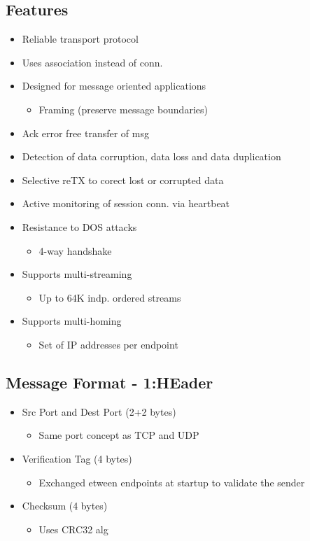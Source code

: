 \documentclass[a4paper]{article}
\begin{document}
\subsection{Features}
\begin{itemize}
	\item Reliable transport protocol
	\item Uses association instead of conn.
	\item Designed for message oriented applications
		\begin{itemize}
			\item Framing (preserve message boundaries)
		\end{itemize}
	\item Ack error free transfer of msg
	\item Detection of data corruption, data loss and data duplication
	\item Selective reTX to corect lost or corrupted data
	\item Active monitoring of session conn. via heartbeat
	\item Resistance to DOS attacks
	\begin{itemize}
		\item 4-way handshake
	\end{itemize}
	\item Supports multi-streaming
	\begin{itemize}
		\item Up to 64K indp. ordered streams
	\end{itemize}
	\item Supports multi-homing
	\begin{itemize}
		\item Set of IP addresses per endpoint
	\end{itemize}
\end{itemize}
\subsection{Message Format - 1:HEader}
\begin{itemize}
	\item Src Port and Dest Port (2+2 bytes)
	\begin{itemize}
		\item Same port concept as TCP and UDP
	\end{itemize}
	\item Verification Tag (4 bytes)
	\begin{itemize}
		\item Exchanged etween endpoints at startup to validate the
			sender
	\end{itemize}
\item Checksum (4 bytes)
	\begin{itemize}
		\item Uses CRC32 alg
	\end{itemize}
\end{itemize}
\end{document}
